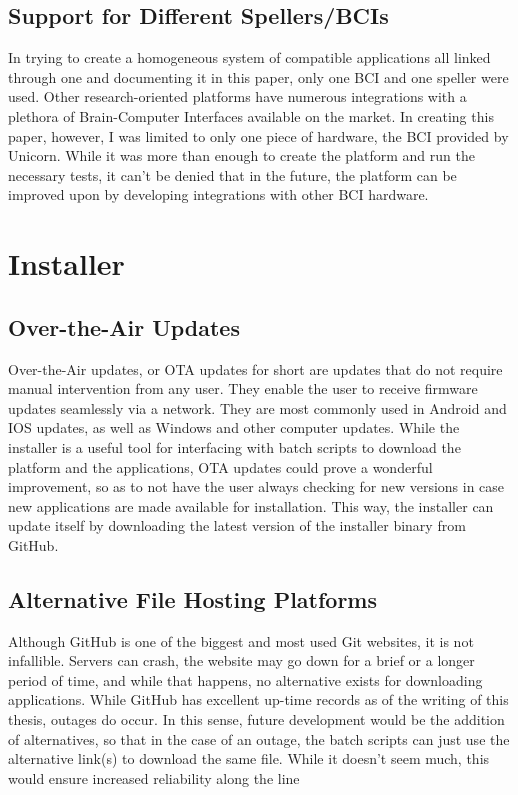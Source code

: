\subsection{Support for Different Spellers/BCIs}
In trying to create a homogeneous system of compatible applications all linked through one and documenting it in this paper, only one BCI and one speller were used. Other research-oriented platforms have numerous integrations with a plethora of Brain-Computer Interfaces available on the market. In creating this paper, however, I was limited to only one piece of hardware, the BCI provided by Unicorn. While it was more than enough to create the platform and run the necessary tests, it can't be denied that in the future, the platform can be improved upon by developing integrations with other BCI hardware.



\section{Installer}
\subsection{Over-the-Air Updates}
Over-the-Air updates, or OTA updates for short are updates that do not require manual intervention from any user. They enable the user to receive firmware updates seamlessly via a network. They are most commonly used in Android and IOS updates, as well as Windows and other computer updates.
\vspace{\baselineskip}\newline
While the installer is a useful tool for interfacing with batch scripts to download the platform and the applications, OTA updates could prove a wonderful improvement, so as to not have the user always checking for new versions in case new applications are made available for installation. This way, the installer can update itself by downloading the latest version of the installer binary from GitHub.

\subsection{Alternative File Hosting Platforms}
Although GitHub is one of the biggest and most used Git websites, it is not infallible. Servers can crash, the website may go down for a brief or a longer period of time, and while that happens, no alternative exists for downloading applications. While GitHub has excellent up-time records as of the writing of this thesis, outages do occur. In this sense, future development would be the addition of alternatives, so that in the case of an outage, the batch scripts can just use the alternative link(s) to download the same file. While it doesn't seem much, this would ensure increased reliability along the line 
